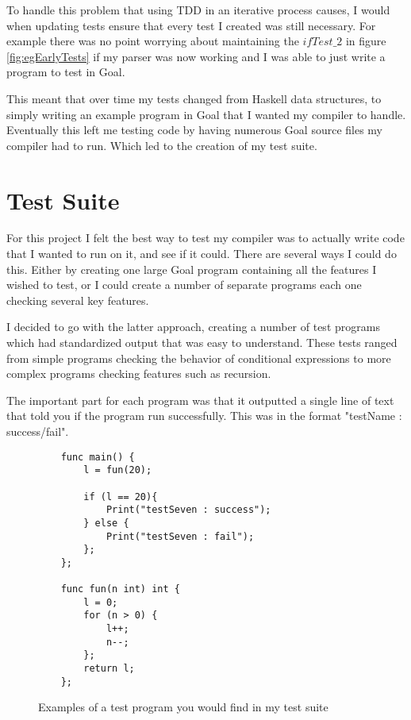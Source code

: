 To handle this problem that using TDD in an iterative process causes, I would when updating tests ensure that every test I created was still necessary. For example there was no point worrying about maintaining the $ifTest\_2$ in figure \ref{fig:egEarlyTests} if my parser was now working and I was able to just write a program to test in Goal. 

This meant that over time my tests changed from Haskell data structures, to simply writing an example program in Goal that I wanted my compiler to handle. Eventually this left me testing code by having numerous Goal source files my compiler had to run. Which led to the creation of my test suite.   

\section{Test Suite}

For this project I felt the best way to test my compiler was to actually write code that I wanted to run on it, and see if it could. There are several ways I could do this. Either by creating one large Goal program containing all the features I wished to test, or I could create a number of separate programs each one checking several key features.

I decided to go with the latter approach, creating a number of test programs which had standardized output that was easy to understand. These tests ranged from simple programs checking the behavior of conditional expressions to more complex programs checking features such as recursion.

The important part for each program was that it outputted a single line of text that told you if the program run successfully. This was in the format "testName : success/fail".   

\begin{figure}[h]
\centering
\begin{lstlisting}
	func main() {
	    l = fun(20);
	    
	    if (l == 20){
	        Print("testSeven : success");
	    } else {
	        Print("testSeven : fail");
	    };
	};
	
	func fun(n int) int {
	    l = 0; 
	    for (n > 0) {
	        l++;
	        n--;
	    };
	    return l;
	};
\end{lstlisting}	
\caption{Examples of a test program you would find in my test suite}
\label{fig:egTestProg} 
\end{figure}   

